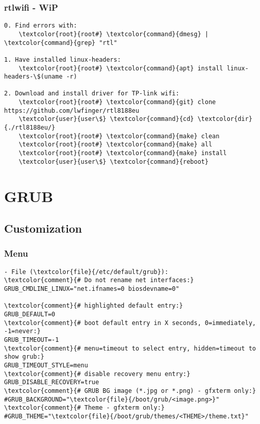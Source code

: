 \documentclass[10pt, a4paper, onecolumn, openany]{book} %
\begin{document}
\subsection{rtlwifi - WiP}
\begin{Verbatim}[commandchars=\\\{\}]
0. Find errors with:
    \textcolor{root}{root#} \textcolor{command}{dmesg} | \textcolor{command}{grep} "rtl"
    
1. Have installed linux-headers:
    \textcolor{root}{root#} \textcolor{command}{apt} install linux-headers-\$(uname -r)

2. Download and install driver for TP-link wifi:
    \textcolor{root}{root#} \textcolor{command}{git} clone https://github.com/lwfinger/rtl8188eu
    \textcolor{user}{user\$} \textcolor{command}{cd} \textcolor{dir}{./rtl8188eu/}
    \textcolor{root}{root#} \textcolor{command}{make} clean
    \textcolor{root}{root#} \textcolor{command}{make} all
    \textcolor{root}{root#} \textcolor{command}{make} install
    \textcolor{user}{user\$} \textcolor{command}{reboot}
\end{Verbatim}


\chapter{GRUB}
\section{Customization}
\subsection{Menu}
\begin{Verbatim}[commandchars=\\\{\}]
- File (\textcolor{file}{/etc/default/grub}):
\textcolor{comment}{# Do not rename net interfaces:}
GRUB_CMDLINE_LINUX="net.ifnames=0 biosdevname=0"

\textcolor{comment}{# highlighted default entry:}
GRUB_DEFAULT=0
\textcolor{comment}{# boot default entry in X seconds, 0=immediately, -1=never:}
GRUB_TIMEOUT=-1
\textcolor{comment}{# menu=timeout to select entry, hidden=timeout to show grub:}
GRUB_TIMEOUT_STYLE=menu
\textcolor{comment}{# disable recovery menu entry:}
GRUB_DISABLE_RECOVERY=true
\textcolor{comment}{# GRUB BG image (*.jpg or *.png) - gfxterm only:}
#GRUB_BACKGROUND="\textcolor{file}{/boot/grub/<image.png>}"
\textcolor{comment}{# Theme - gfxterm only:}
#GRUB_THEME="\textcolor{file}{/boot/grub/themes/<THEME>/theme.txt}"
\end{Verbatim}
\end{document}
